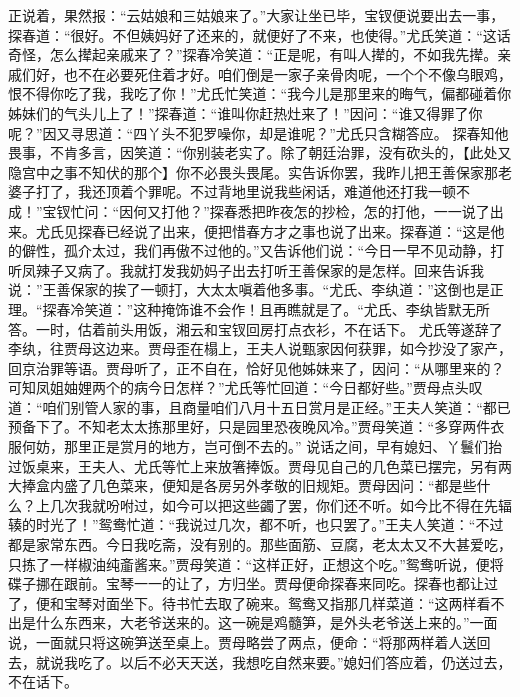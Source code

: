 \documentclass[12pt,oneside]{book}
\begin{document}
正说着，果然报：“云姑娘和三姑娘来了。”大家让坐已毕，宝钗便说要出去一事，探春道：“很好。不但姨妈好了还来的，就便好了不来，也使得。”尤氏笑道：“这话奇怪，怎么撵起亲戚来了？”探春冷笑道：“正是呢，有叫人撵的，不如我先撵。亲戚们好，也不在必要死住着才好。咱们倒是一家子亲骨肉呢，一个个不像乌眼鸡，恨不得你吃了我，我吃了你！”尤氏忙笑道：“我今儿是那里来的晦气，偏都碰着你姊妹们的气头儿上了！”探春道：“谁叫你赶热灶来了！”因问：“谁又得罪了你呢？”因又寻思道：“四丫头不犯罗噪你，却是谁呢？”尤氏只含糊答应。
探春知他畏事，不肯多言，因笑道：“你别装老实了。除了朝廷治罪，没有砍头的，【此处又隐宫中之事不知伏的那个】你不必畏头畏尾。实告诉你罢，我昨儿把王善保家那老婆子打了，我还顶着个罪呢。不过背地里说我些闲话，难道他还打我一顿不成！”宝钗忙问：“因何又打他？”探春悉把昨夜怎的抄检，怎的打他，一一说了出来。尤氏见探春已经说了出来，便把惜春方才之事也说了出来。探春道：“这是他的僻性，孤介太过，我们再傲不过他的。”又告诉他们说：“今日一早不见动静，打听凤辣子又病了。我就打发我奶妈子出去打听王善保家的是怎样。回来告诉我说：”王善保家的挨了一顿打，大太太嗔着他多事。“尤氏、李纨道：”这倒也是正理。“探春冷笑道：”这种掩饰谁不会作！且再瞧就是了。“尤氏、李纨皆默无所答。一时，估着前头用饭，湘云和宝钗回房打点衣衫，不在话下。
尤氏等遂辞了李纨，往贾母这边来。贾母歪在榻上，王夫人说甄家因何获罪，如今抄没了家产，回京治罪等语。贾母听了，正不自在，恰好见他姊妹来了，因问：“从哪里来的？可知凤姐妯娌两个的病今日怎样？”尤氏等忙回道：“今日都好些。”贾母点头叹道：“咱们别管人家的事，且商量咱们八月十五日赏月是正经。”王夫人笑道：“都已预备下了。不知老太太拣那里好，只是园里恐夜晚风冷。”贾母笑道：“多穿两件衣服何妨，那里正是赏月的地方，岂可倒不去的。”
说话之间，早有媳妇、丫鬟们抬过饭桌来，王夫人、尤氏等忙上来放箸捧饭。贾母见自己的几色菜已摆完，另有两大捧盒内盛了几色菜来，便知是各房另外孝敬的旧规矩。贾母因问：“都是些什么？上几次我就吩咐过，如今可以把这些蠲了罢，你们还不听。如今比不得在先辐辏的时光了！”鸳鸯忙道：“我说过几次，都不听，也只罢了。”王夫人笑道：“不过都是家常东西。今日我吃斋，没有别的。那些面筋、豆腐，老太太又不大甚爱吃，只拣了一样椒油纯齑酱来。”贾母笑道：“这样正好，正想这个吃。”鸳鸯听说，便将碟子挪在跟前。宝琴一一的让了，方归坐。贾母便命探春来同吃。探春也都让过了，便和宝琴对面坐下。待书忙去取了碗来。鸳鸯又指那几样菜道：“这两样看不出是什么东西来，大老爷送来的。这一碗是鸡髓笋，是外头老爷送上来的。”一面说，一面就只将这碗笋送至桌上。贾母略尝了两点，便命：“将那两样着人送回去，就说我吃了。以后不必天天送，我想吃自然来要。”媳妇们答应着，仍送过去，不在话下。
\end{document}
